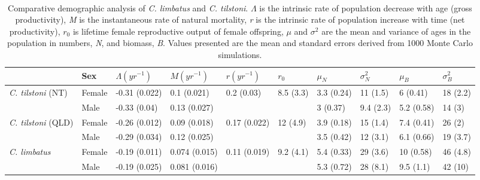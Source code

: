 \documentclass[]{article}
\begin{document}
\begin{landscape}
\
\
\begin{table}[ht]
\centering
\caption{Comparative demographic analysis of \textit{C. limbatus} and \textit{C. tilstoni}. $\Lambda$ is the intrinsic rate of population decrease with age (gross productivity), \textit{M} is the instantaneous rate of natural mortality, \textit{r} is the intrinsic rate of population increase with time (net productivity), $r_{0}$ is lifetime female reproductive output of female offspring, $\mu$ and $\sigma^2$ are the mean and variance of ages in the population in numbers, \textit{N}, and biomass, \textit{B}. Values presented are the mean and standard errors derived from 1000 Monte Carlo simulations.} 
\begin{tabular}{llllllllll}
  \toprule
   & Sex & $\Lambda (yr^{-1})$ & $M (yr^{-1})$ & $r (yr^{-1})$ & $r_{0}$ & $\mu_N$ & $\sigma^2_N$ & $\mu_B$ & $\sigma^2_B$ \\ 
  \midrule
\textit{C. tilstoni} (NT) & Female & -0.31 (0.022) & 0.1 (0.021) & 0.2 (0.03) & 8.5 (3.3) & 3.3 (0.24) & 11 (1.5) & 6 (0.41) & 18 (2.2) \\ 
   & Male & -0.33 (0.04) & 0.13 (0.027) &  &  & 3 (0.37) & 9.4 (2.3) & 5.2 (0.58) & 14 (3) \\ 
  \textit{C. tilstoni} (QLD) & Female & -0.26 (0.012) & 0.09 (0.018) & 0.17 (0.022) & 12 (4.9) & 3.9 (0.18) & 15 (1.4) & 7.4 (0.41) & 26 (2) \\ 
   & Male & -0.29 (0.034) & 0.12 (0.025) &  &  & 3.5 (0.42) & 12 (3.1) & 6.1 (0.66) & 19 (3.7) \\ 
  \textit{C. limbatus} & Female & -0.19 (0.011) & 0.074 (0.015) & 0.11 (0.019) & 9.2 (4.1) & 5.4 (0.33) & 29 (3.6) & 10 (0.58) & 46 (4.8) \\ 
   & Male & -0.19 (0.025) & 0.081 (0.016) &  &  & 5.3 (0.72) & 28 (8.1) & 9.5 (1.1) & 42 (10) \\ 
   \bottomrule
\end{tabular}
\end{table}

\end{landscape}
\end{document}
